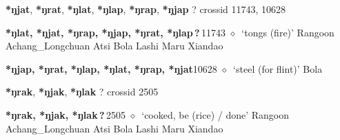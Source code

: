\item
\textbf{*ŋjat}, \textbf{*ŋrat}, \textbf{*ŋlat}, \textbf{*ŋlap}, \textbf{*ŋrap}, \textbf{*ŋjap}
?
  {\tiny crossid 11743, 10628}
  \begin{list}{}{\leftmargin=1.5em \itemindent=-1.5em}
  \item {\footnotesize \textbf{*ŋlat, *ŋjat, *ŋrap, *ŋjap, *ŋrat, *ŋlap\,?\,}}{\tiny 11743}
         $\diamond$~`tongs (fire)'
         Rangoon 
\hspace{1ex}
         Achang\_Longchuan 
\hspace{1ex}
         Atsi 
\hspace{1ex}
         Bola 
\hspace{1ex}
         Lashi 
\hspace{1ex}
         Maru 
\hspace{1ex}
         Xiandao 
  \item {\footnotesize \textbf{*ŋjap, *ŋrat, *ŋlap, *ŋlat, *ŋrap, *ŋjat}}{\tiny 10628}
\hspace{1ex}
         $\diamond$~`steel (for flint)'
         Bola 
  \end{list}
\item
\textbf{*ŋrak}, \textbf{*ŋjak}, \textbf{*ŋlak}
?
  {\tiny crossid 2505}
  \begin{list}{}{\leftmargin=1.5em \itemindent=-1.5em}
  \item {\footnotesize \textbf{*ŋrak, *ŋjak, *ŋlak\,?\,}}{\tiny 2505}
         $\diamond$~`cooked, be (rice) / done'
         Rangoon 
\hspace{1ex}
         Achang\_Longchuan 
\hspace{1ex}
         Atsi 
\hspace{1ex}
         Bola 
\hspace{1ex}
         Lashi 
\hspace{1ex}
         Maru 
\hspace{1ex}
         Xiandao 
  \end{list}
